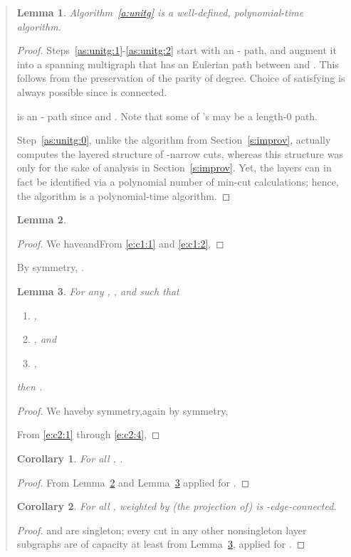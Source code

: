 \documentclass[11pt,letterpaper]{article}
\newtheorem{lemma}{Lemma}
\newtheorem{cor}{Corollary}
\newcommand{\st}{\mbox{-} }
\begin{document}
\begin{quote}
\begin{lemma}\label{l:wd}
Algorithm~\ref{a:unitg} is a well-defined, polynomial-time algorithm.
\end{lemma}
\begin{proof}
Steps~\ref{as:unitg:1}-\ref{as:unitg:2} start with an \st path, and augment it into a spanning multigraph that has an Eulerian path between  and . This follows from the preservation of the parity of degree. Choice of  satisfying  is always possible since  is connected.

 is an \st path since  and . Note that some of 's may be a length-0 path.

Step~\ref{as:unitg:0}, unlike the algorithm from Section~\ref{s:improv}, actually computes the layered structure of -narrow cuts, whereas this structure was only for the sake of analysis in Section~\ref{s:improv}. Yet, the layers can in fact be identified via a polynomial number of min-cut calculations; hence, the algorithm is a polynomial-time algorithm.
\end{proof}

\begin{lemma}\label{l:c1}

\end{lemma}
\begin{proof}
We haveandFrom \eqref{e:c1:1} and \eqref{e:c1:2},
\end{proof}
By symmetry, .

\begin{lemma}\label{l:c2}
For any , ,  and  such that\begin{enumerate}
\item ,
\item , and
\item ,
\end{enumerate}then .
\end{lemma}
\begin{proof}
We haveby symmetry,again by symmetry,

From \eqref{e:c2:1} through \eqref{e:c2:4},
\end{proof}

\begin{cor}\label{c:ccut}
For all , .
\end{cor}
\begin{proof}
From Lemma~\ref{l:c1} and Lemma~\ref{l:c2} applied for .
\end{proof}

\begin{cor}\label{c:clayer}
For all ,  weighted by (the projection of)  is -edge-connected.
\end{cor}
\begin{proof}
 and  are singleton; every cut in any other nonsingleton layer subgraphs are of capacity at least  from Lemma~\ref{l:c2}, applied for .
\end{proof}


\end{quote}
\end{document}
